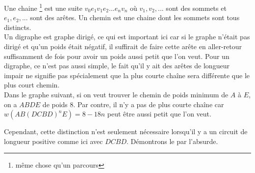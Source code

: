 \begin{solution}
  Une chaine \footnote{même chose qu'un parcours} est une suite $v_0e_1v_1e_2...e_nv_n $ où $v_1,v_2,...$ sont des sommets et $e_1,e_2,...$ sont des arêtes.
  Un chemin est une chaine dont les sommets sont tous distincts.\\

  Un digraphe est graphe dirigé, ce qui est important ici car si le graphe n'était pas dirigé et qu'un poids
  était négatif, il suffirait de faire cette arête en aller-retour suffisamment de fois pour avoir un poids
  aussi petit que l'on veut.
  Pour un digraphe, ce n'est pas aussi simple, le fait qu'il y ait des arêtes de longueur impair ne signifie pas
  spécialement que la plus courte chaîne sera différente que le plus court chemin.\\

  Dans le graphe suivant,
  si on veut trouver le chemin de poids minimum de $A$ à $E$, on a $ABDE$ de poids $8$.
  Par contre, il n'y a pas de plus courte chaîne car $w(AB(DCBD)^nE) = 8 - 18n$ peut être aussi
  petit que l'on veut.\\

  \begin{center}
  \end{center}

  Cependant, cette distinction n'est seulement nécessaire lorsqu'il y a
  un circuit de longueur positive comme ici avec $DCBD$.
  Démontrons le par l'absurde.\\


\end{solution}
